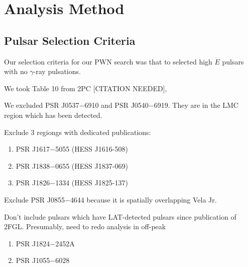 \section{Analysis Method}

\subsection{Pulsar Selection Criteria}

Our selection criteria for our PWN search was that to selected high $\dot E$
pulsars with no $\gamma$-ray pulsations.

We took Table 10 from 2PC [CITATION NEEDED],

We excluded PSR J0537$-$6910 and PSR J0540$-$6919. They are in the LMC region which has been detected.

Exclude 3 regiongs with dedicated publications:
\begin{enumerate}
  \item PSR J1617$-$5055 (HESS J1616-508)
  \item PSR J1838$-$0655 (HESS J1837-069)
  \item PSR J1826$-$1334 (HESS J1825-137)
\end{enumerate}

Exclude PSR J0855$-$4644 because it is spatially overlapping Vela Jr.

Don't include pulsars which have LAT-detected pulsars since publication of 2FGL.
Presumably, need to redo analysis in off-peak
\begin{enumerate}
  \item PSR J1824$-$2452A 
  \item PSR J1055$-$6028
\end{enumerate}

